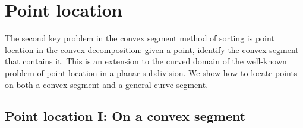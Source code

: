 \section{Point location}
\label{s-loc}

The second key problem in the convex segment method of sorting is
point location in the convex decomposition: given a point, identify
the convex segment that contains it.
This is an extension to the curved domain of the well-known problem of point 
location in a planar subdivision. 
We show how to locate points on both a convex segment and a general curve segment.

\subsection{Point location I: On a convex segment}

